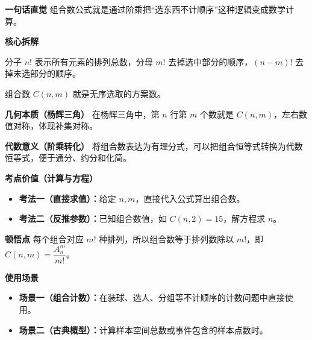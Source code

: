 \begin{explanationbox}
	\textbf{\textcolor{CExplanation}{一句话直觉}}
	组合数公式就是通过阶乘把“选东西不计顺序”这种逻辑变成数学计算。

	\medskip
	\textbf{\textcolor{CExplanation}{核心拆解}}
	\begin{description}[style=nextline, leftmargin=2.8em, labelsep=0.5em, itemsep=0.45em]
		\item[\textbf{要点一（阶乘结构）：}]
			分子 $n!$ 表示所有元素的排列总数，分母 $m!$ 去掉选中部分的顺序，$(n-m)!$ 去掉未选部分的顺序。
		\item[\textbf{要点二（组合意义）：}]
			组合数 $C(n,m)$ 就是无序选取的方案数。
	\end{description}

	\medskip
	\textbf{\textcolor{CExplanation}{几何本质（杨辉三角）}}
	在杨辉三角中，第 $n$ 行第 $m$ 个数就是 $C(n,m)$，左右数值对称，体现补集对称。

	\medskip
	\textbf{\textcolor{CExplanation}{代数意义（阶乘转化）}}
	将组合数表达为有理分式，可以把组合恒等式转换为代数恒等式，便于通分、约分和化简。

	\medskip
	\textbf{\textcolor{CExplanation}{考点价值（计算与方程）}}
	\begin{itemize}[leftmargin=*, itemsep=0.5em, topsep=0.4em]
		\item \textbf{考法一（直接求值）：}给定 $n,m$，直接代入公式算出组合数。
		\item \textbf{考法二（反推参数）：}已知组合数值，如 $C(n,2)=15$，解方程求 $n$。
	\end{itemize}

	\medskip
	\textbf{\textcolor{CExplanation}{顿悟点}}
	每个组合对应 $m!$ 种排列，所以组合数等于排列数除以 $m!$，即 $C(n,m)=\dfrac{A_n^m}{m!}$。

	\medskip
	\textbf{\textcolor{CExplanation}{使用场景}}
	\begin{itemize}[leftmargin=*, itemsep=0.5em, topsep=0.4em]
		\item \textbf{场景一（组合计数）：}在装球、选人、分组等不计顺序的计数问题中直接使用。
		\item \textbf{场景二（古典概型）：}计算样本空间总数或事件包含的样本点数时。
	\end{itemize}

\end{explanationbox}
